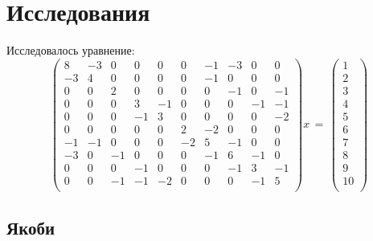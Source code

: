 \documentclass[oneside, final, 12pt]{extarticle}
\begin{document}
\lstset{caption=main.cc}


\section{Исследования}

Исследовалось уравнение:
\[ \begin{pmatrix}
	8 & -3 & 0 & 0 & 0 & 0 & -1 & -3 & 0 & 0 \\
	-3 & 4 & 0 & 0 & 0 & 0 & -1 & 0 & 0 & 0 \\
	0 & 0 & 2 & 0 & 0 & 0 & 0 & -1 & 0 & -1 \\
	0 & 0 & 0 & 3 & -1 & 0 & 0 & 0 & -1 & -1 \\
	0 & 0 & 0 & -1 & 3 & 0 & 0 & 0 & 0 & -2 \\
	0 & 0 & 0 & 0 & 0 & 2 & -2 & 0 & 0 & 0 \\
	-1 & -1 & 0 & 0 & 0 & -2 & 5 & -1 & 0 & 0 \\
	-3 & 0 & -1 & 0 & 0 & 0 & -1 & 6 & -1 & 0 \\
	0 & 0 & 0 & -1 & 0 & 0 & 0 & -1 & 3 & -1 \\
	0 & 0 & -1 & -1 & -2 & 0 & 0 & 0 & -1 & 5 \\
\end{pmatrix}
x\,=\,
\begin{pmatrix}
	1 \\ 2 \\ 3 \\ 4 \\ 5 \\ 6 \\ 7 \\ 8 \\ 9 \\ 10 \\
\end{pmatrix}\]

\subsection{Якоби}
\end{document}
